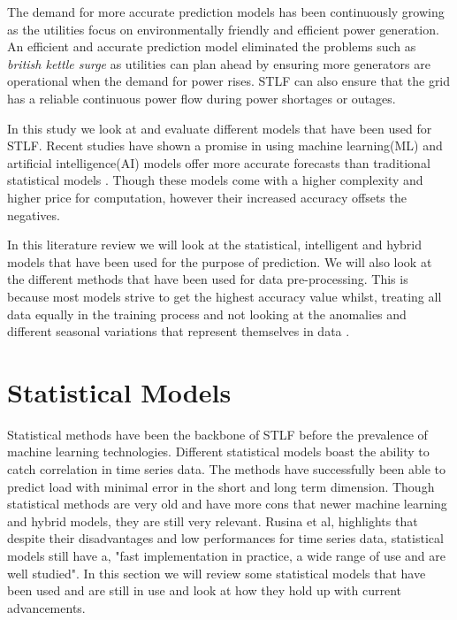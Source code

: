  The demand for more accurate prediction models has been continuously growing as the utilities focus on environmentally friendly and efficient power generation. An efficient and accurate prediction model eliminated the problems such as \textit{british kettle surge} as utilities can plan ahead by ensuring more generators are operational when the demand for power rises. STLF can also ensure that the grid has a reliable continuous power flow during power shortages or outages\cite{tarmanini2023short}.

In this study we look at and evaluate different models that have been used for STLF. Recent studies have shown a promise in using machine learning(ML) and artificial intelligence(AI) models offer more accurate forecasts than traditional statistical models \cite{tshipata2024multi}. Though these models come with a higher complexity and higher price for computation, however their increased accuracy offsets the negatives.

 In this literature  review we will look at the statistical, intelligent and hybrid models that have been used for the purpose of prediction. We will also look at the different methods that have been used for data pre-processing. This is because most models strive to get the highest accuracy value whilst, treating all data equally in the training process and not looking at the anomalies and different seasonal variations that represent themselves in  data \cite{wang2023improving}.
 
 
 
 \section{Statistical Models }
 Statistical methods have been the backbone of STLF before the prevalence of machine learning technologies. Different statistical models boast the ability to catch correlation in time series data. The methods have successfully been able to predict load with minimal error in the short and long term dimension. Though statistical methods are very old and have more cons that newer machine learning and hybrid models, they are still very relevant. Rusina et al, \cite{Rusina2022ShorttermLFH} highlights that despite their disadvantages and low performances for time series data, statistical models still have a, "fast implementation in practice, a wide range of use and are well studied". In this section we will review some statistical models that have been used and are still in use and look at how they hold up with current advancements.
 
